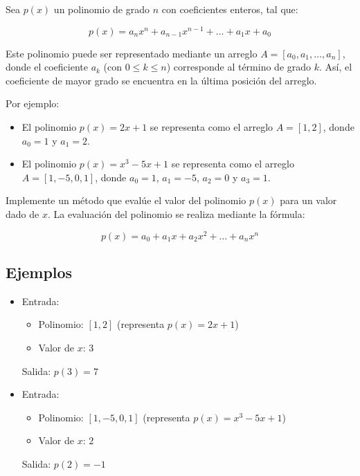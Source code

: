 Sea \( p(x) \) un polinomio de grado \( n \) con coeficientes enteros, tal que:
    
\[
p(x) = a_n x^n + a_{n-1} x^{n-1} + \dots + a_1 x + a_0
\]

Este polinomio puede ser representado mediante un arreglo \( A = [a_0, a_1, \dots, a_n] \), donde el coeficiente \( a_k \) (con \( 0 \leq k \leq n \)) corresponde al término de grado \( k \). Así, el coeficiente de mayor grado se encuentra en la última posición del arreglo.

Por ejemplo:

\begin{itemize}
    \item El polinomio \( p(x) = 2x + 1 \) se representa como el arreglo \( A = [1, 2] \), donde \( a_0 = 1 \) y \( a_1 = 2 \).
    \item El polinomio \( p(x) = x^3 - 5x + 1 \) se representa como el arreglo \( A = [1, -5, 0, 1] \), donde \( a_0 = 1 \), \( a_1 = -5 \), \( a_2 = 0 \) y \( a_3 = 1 \).
\end{itemize}

Implemente un método que evalúe el valor del polinomio \( p(x) \) para un valor dado de \( x \). La evaluación del polinomio se realiza mediante la fórmula:

\[
p(x) = a_0 + a_1 x + a_2 x^2 + \dots + a_n x^n
\]

\subsection*{Ejemplos}
\begin{itemize}
    \item Entrada:
    \begin{itemize}
        \item Polinomio: \([1, 2]\) (representa \(p(x) = 2x + 1\))
        \item Valor de \(x\): \(3\)
    \end{itemize}
    Salida: \( p(3) = 7 \)
    
    \item Entrada:
    \begin{itemize}
        \item Polinomio: \([1, -5, 0, 1]\) (representa \(p(x) = x^3 - 5x + 1\))
        \item Valor de \(x\): \(2\)
    \end{itemize}
    Salida: \( p(2) = -1 \)
\end{itemize}